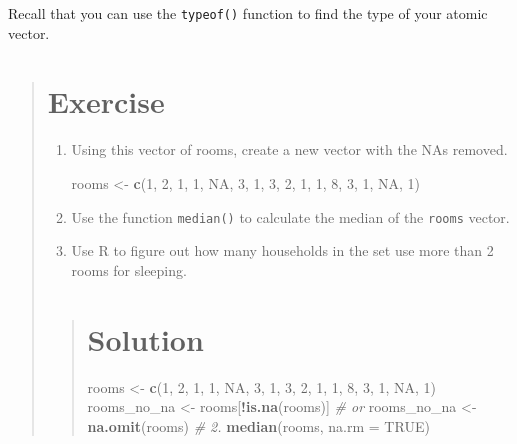 \documentclass[]{book}
\newenvironment{Shaded}{\begin{snugshade}}{\end{snugshade}}
\newcommand{\KeywordTok}[1]{\textcolor[rgb]{0.13,0.29,0.53}{\textbf{#1}}}
\newcommand{\DataTypeTok}[1]{\textcolor[rgb]{0.13,0.29,0.53}{#1}}
\newcommand{\DecValTok}[1]{\textcolor[rgb]{0.00,0.00,0.81}{#1}}
\newcommand{\StringTok}[1]{\textcolor[rgb]{0.31,0.60,0.02}{#1}}
\newcommand{\CommentTok}[1]{\textcolor[rgb]{0.56,0.35,0.01}{\textit{#1}}}
\newcommand{\OtherTok}[1]{\textcolor[rgb]{0.56,0.35,0.01}{#1}}
\newcommand{\OperatorTok}[1]{\textcolor[rgb]{0.81,0.36,0.00}{\textbf{#1}}}
\newcommand{\NormalTok}[1]{#1}
\begin{document}
Recall that you can use the \texttt{typeof()} function to find the type
of your atomic vector.

\begin{quote}
\section{Exercise}\label{exercise-5}

\begin{enumerate}
\def\labelenumi{\arabic{enumi}.}
\item
  Using this vector of rooms, create a new vector with the NAs removed.

\begin{Shaded}
\begin{Highlighting}[]
\NormalTok{rooms <-}\StringTok{ }\KeywordTok{c}\NormalTok{(}\DecValTok{1}\NormalTok{, }\DecValTok{2}\NormalTok{, }\DecValTok{1}\NormalTok{, }\DecValTok{1}\NormalTok{, }\OtherTok{NA}\NormalTok{, }\DecValTok{3}\NormalTok{, }\DecValTok{1}\NormalTok{, }\DecValTok{3}\NormalTok{, }\DecValTok{2}\NormalTok{, }\DecValTok{1}\NormalTok{, }\DecValTok{1}\NormalTok{, }\DecValTok{8}\NormalTok{, }\DecValTok{3}\NormalTok{, }\DecValTok{1}\NormalTok{, }\OtherTok{NA}\NormalTok{, }\DecValTok{1}\NormalTok{)}
\end{Highlighting}
\end{Shaded}
\item
  Use the function \texttt{median()} to calculate the median of the
  \texttt{rooms} vector.
\item
  Use R to figure out how many households in the set use more than 2
  rooms for sleeping.
\end{enumerate}

\begin{quote}
\section{Solution}\label{solution-6}

\begin{Shaded}
\begin{Highlighting}[]
\NormalTok{rooms <-}\StringTok{ }\KeywordTok{c}\NormalTok{(}\DecValTok{1}\NormalTok{, }\DecValTok{2}\NormalTok{, }\DecValTok{1}\NormalTok{, }\DecValTok{1}\NormalTok{, }\OtherTok{NA}\NormalTok{, }\DecValTok{3}\NormalTok{, }\DecValTok{1}\NormalTok{, }\DecValTok{3}\NormalTok{, }\DecValTok{2}\NormalTok{, }\DecValTok{1}\NormalTok{, }\DecValTok{1}\NormalTok{, }\DecValTok{8}\NormalTok{, }\DecValTok{3}\NormalTok{, }\DecValTok{1}\NormalTok{, }\OtherTok{NA}\NormalTok{, }\DecValTok{1}\NormalTok{)}
\NormalTok{rooms_no_na <-}\StringTok{ }\NormalTok{rooms[}\OperatorTok{!}\KeywordTok{is.na}\NormalTok{(rooms)]}
\CommentTok{# or}
\NormalTok{rooms_no_na <-}\StringTok{ }\KeywordTok{na.omit}\NormalTok{(rooms)}
\CommentTok{# 2.}
\KeywordTok{median}\NormalTok{(rooms, }\DataTypeTok{na.rm =} \OtherTok{TRUE}\NormalTok{)}
\end{Highlighting}
\end{Shaded}


\end{quote}
\end{quote}
\end{document}
